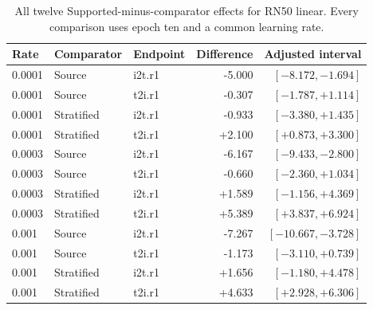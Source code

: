 \begin{table}[t]
\centering
\small
\setlength{\tabcolsep}{3pt}
\begin{tabular}{lllrr}
\toprule
Rate & Comparator & Endpoint & Difference & Adjusted interval\\
\midrule
0.0001 & Source & i2t.r1 & -5.000 & $[-8.172,-1.694]$ \\
0.0001 & Source & t2i.r1 & -0.307 & $[-1.787,+1.114]$ \\
0.0001 & Stratified & i2t.r1 & -0.933 & $[-3.380,+1.435]$ \\
0.0001 & Stratified & t2i.r1 & +2.100 & $[+0.873,+3.300]$ \\
0.0003 & Source & i2t.r1 & -6.167 & $[-9.433,-2.800]$ \\
0.0003 & Source & t2i.r1 & -0.660 & $[-2.360,+1.034]$ \\
0.0003 & Stratified & i2t.r1 & +1.589 & $[-1.156,+4.369]$ \\
0.0003 & Stratified & t2i.r1 & +5.389 & $[+3.837,+6.924]$ \\
0.001 & Source & i2t.r1 & -7.267 & $[-10.667,-3.728]$ \\
0.001 & Source & t2i.r1 & -1.173 & $[-3.110,+0.739]$ \\
0.001 & Stratified & i2t.r1 & +1.656 & $[-1.180,+4.478]$ \\
0.001 & Stratified & t2i.r1 & +4.633 & $[+2.928,+6.306]$ \\
\bottomrule
\end{tabular}
\caption{All twelve Supported-minus-comparator effects for RN50 linear. Every comparison uses epoch ten and a common learning rate.}\label{tab:rn50partial}
\end{table}


